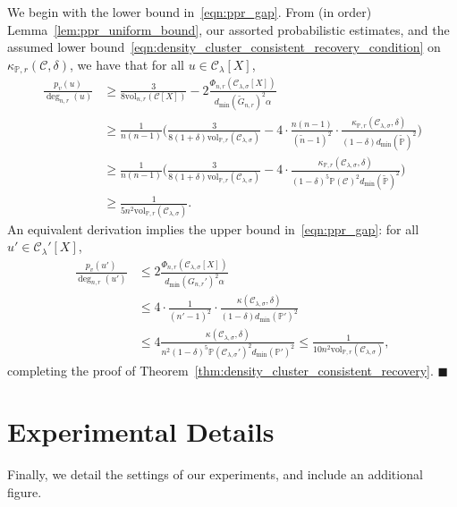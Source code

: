 \documentclass[twoside,11pt]{article}
\newcommand{\1}{\mathbf{1}}
\newcommand{\mc}[1]{\mathcal{#1}}
\newcommand{\Pbb}{\mathbb{P}}
\newcommand{\wt}[1]{\widetilde{#1}}
\newcommand{\vol}{\mathrm{vol}}
\newcommand{\qed}{\hfill $\blacksquare$}
\begin{document}
We begin with the lower bound in~\eqref{eqn:ppr_gap}. From (in order) Lemma~\ref{lem:ppr_uniform_bound}, our assorted probabilistic estimates, and the assumed lower bound~\eqref{eqn:density_cluster_consistent_recovery_condition} on $\kappa_{\Pbb,r}(\mc{C},\delta)$, we have that for all $u \in \mc{C}_{\lambda}[X]$,
\begin{align*}
\frac{p_v(u)}{\deg_{n,r}(u)} & \geq \frac{3}{8\vol_{n,r}(\mc{C}[X])} - 2\frac{\Phi_{n,r}(\mc{C}_{\lambda,\sigma}[X])}{d_{\min}(\wt{G}_{n,r})^2 \alpha} \\
& \geq \frac{1}{n(n - 1)}\biggl(\frac{3}{8(1 + \delta)\vol_{\Pbb,r}(\mc{C}_{\lambda,\sigma})} - 4 \cdot \frac{n(n - 1)}{(\wt{n} - 1)^2} \cdot \frac{\kappa_{\Pbb,r}(\mc{C}_{\lambda,\sigma},\delta)}{(1 - \delta) d_{\min}(\wt{\Pbb})^2}\biggr) \\
& \geq \frac{1}{n(n - 1)}\biggl(\frac{3}{8(1 + \delta)\vol_{\Pbb,r}(\mc{C}_{\lambda,\sigma})} - 4 \cdot \frac{\kappa_{\Pbb,r}(\mc{C}_{\lambda,\sigma},\delta)}{(1 - \delta)^5 \Pbb(\mc{C})^2 d_{\min}(\wt{\Pbb})^2}\biggr) \\
& \geq \frac{1}{5 n^2\vol_{\Pbb,r}(\mc{C}_{\lambda,\sigma})}.
\end{align*}
An equivalent derivation implies the upper bound in~\eqref{eqn:ppr_gap}: for all $u' \in \mc{C}_{\lambda}'[X]$,
\begin{align*}
\frac{p_v(u')}{\deg_{n,r}(u')} & \leq 2 \frac{\Phi_{n,r}(\mc{C}_{\lambda,\sigma}[X])}{d_{\min}(G_{n,r}')^2 \alpha} \\
& \leq 4 \cdot \frac{1}{(n' - 1)^2} \cdot \frac{ \kappa(\mc{C}_{\lambda,\sigma},\delta)}{(1 - \delta) d_{\min}(\Pbb')^2} \\
& \leq 4\frac{ \kappa(\mc{C}_{\lambda,\sigma},\delta)}{n^2 (1 - \delta)^5 \Pbb(\mc{C}_{\lambda,\sigma}')^2 d_{\min}(\Pbb')^2} \leq \frac{1}{10 n^2\vol_{\Pbb,r}(\mc{C}_{\lambda,\sigma})},
\end{align*}
completing the proof of Theorem~\ref{thm:density_cluster_consistent_recovery}. \qed

\section{Experimental Details}
\label{apdx:experimental_details}
Finally, we detail the settings of our experiments, and include an additional figure.
\end{document}
